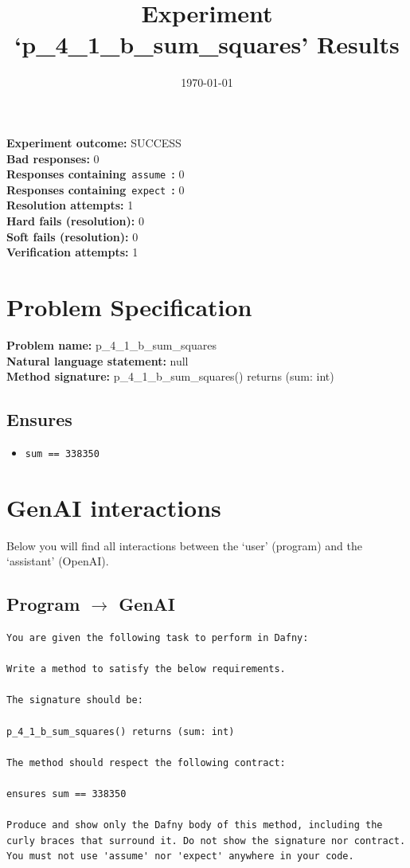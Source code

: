 \documentclass{article}
\begin{document}
\title{Experiment `p\_4\_1\_b\_sum\_squares' Results}
\author{\today}
\date{}
\maketitle
\textbf{Experiment outcome: }SUCCESS
\\\textbf{Bad responses: }0
\\\textbf{Responses containing}~\texttt{assume}~\textbf{: }0
\\\textbf{Responses containing}~\texttt{expect}~\textbf{: }0
\\\textbf{Resolution attempts: }1
\\\textbf{Hard fails (resolution): }0
\\\textbf{Soft fails (resolution): }0
\\\textbf{Verification attempts: }1
\section*{Problem Specification}
\textbf{Problem name: }p\_4\_1\_b\_sum\_squares
\\\textbf{Natural language statement: }null
\\\textbf{Method signature: }p\_4\_1\_b\_sum\_squares() returns (sum: int)
\subsection*{Ensures}
\begin{itemize}
\item \texttt{sum == 338350}
\end{itemize}
\clearpage
\section*{GenAI interactions}
Below you will find all interactions between the `user' (program) and the `assistant' (OpenAI).
\subsection*{Program $\rightarrow$ GenAI}
\begin{lstlisting}
You are given the following task to perform in Dafny:

Write a method to satisfy the below requirements.

The signature should be:

p_4_1_b_sum_squares() returns (sum: int)

The method should respect the following contract:

ensures sum == 338350

Produce and show only the Dafny body of this method, including the curly braces that surround it. Do not show the signature nor contract. You must not use 'assume' nor 'expect' anywhere in your code.
\end{lstlisting}
\end{document}

